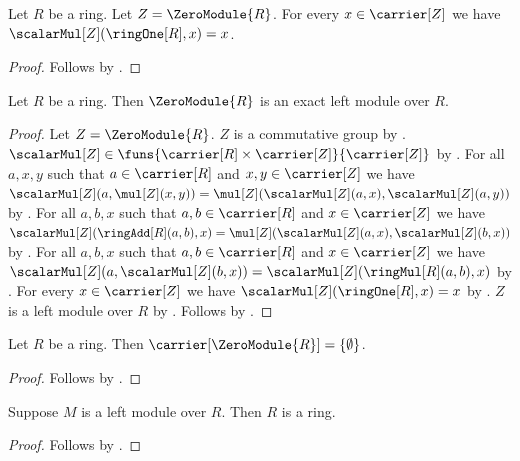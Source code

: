 \begin{proposition}\label{zero_module_scalar_one}
    Let $R$ be a ring.
    Let $Z=\ZeroModule{R}$.
    For every $x\in\carrier[Z]$ we have
        $\scalarMul[Z](\ringOne[R],x)=x$.
\end{proposition}
\begin{proof}
    Follows by
        .
\end{proof}

\begin{theorem}\label{zero_module_is_exact}
    Let $R$ be a ring.
    Then $\ZeroModule{R}$ is an exact left module over $R$.
\end{theorem}
\begin{proof}
    Let $Z=\ZeroModule{R}$.
    $Z$ is a commutative group by
        .
    $\scalarMul[Z]\in
        \funs{\carrier[R]\times\carrier[Z]}{\carrier[Z]}$ by
        .
    For all $a,x,y$ such that $a\in\carrier[R]$ and
        $x,y\in\carrier[Z]$ we have
        $\scalarMul[Z](a,\mul[Z](x,y))
            =\mul[Z](\scalarMul[Z](a,x),\scalarMul[Z](a,y))$ by
        .
    For all $a,b,x$ such that $a,b\in\carrier[R]$ and
        $x\in\carrier[Z]$ we have
        $\scalarMul[Z](\ringAdd[R](a,b),x)
            =\mul[Z](\scalarMul[Z](a,x),\scalarMul[Z](b,x))$ by
        .
    For all $a,b,x$ such that $a,b\in\carrier[R]$ and
        $x\in\carrier[Z]$ we have
        $\scalarMul[Z](a,\scalarMul[Z](b,x))
            =\scalarMul[Z](\ringMul[R](a,b),x)$ by
        .
    For every $x\in\carrier[Z]$ we have
        $\scalarMul[Z](\ringOne[R],x)=x$ by
        .
    $Z$ is a left module over $R$ by
        .
    Follows by .
\end{proof}

\begin{corollary}\label{zero_module_carrier}
    Let $R$ be a ring.
    Then $\carrier[\ZeroModule{R}]=\{\emptyset\}$.
\end{corollary}
\begin{proof}
    Follows by .
\end{proof}

\begin{proposition}\label{module_scalar_ring}
    Suppose $M$ is a left module over $R$.
    Then $R$ is a ring.
\end{proposition}
\begin{proof}
    Follows by .
\end{proof}

